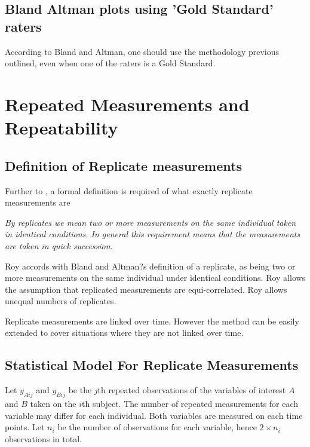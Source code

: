 \documentclass[12pt, a4paper]{report}
\theoremstyle{plain}
\theoremstyle{definition}
\theoremstyle{remark}
\begin{document}
		\newpage



	
	
	\section{Bland Altman plots using 'Gold Standard' raters}
	According to Bland and Altman, one should use the methodology
	previous outlined, even when one of the raters is a Gold Standard.
	
\chapter{Repeated Measurements and Repeatability}
	
	
	
	\section{Definition of Replicate measurements}
	Further to \citet{BA99}, a formal definition is required of what exactly replicate measurements are
	
	\emph{By replicates we mean two or more measurements on the same
		individual taken in identical conditions. In general this requirement means that the
		measurements are taken in quick succession.}
	
	Roy accords with Bland and Altman?s definition of a replicate, as being two or more measurements on the same individual under identical conditions. Roy allows the assumption that replicated measurements are equi-correlated. Roy allows unequal numbers of replicates.
	
	Replicate measurements are linked over time. However the method can be easily extended to cover situations where they are not linked over time.

	\section{Statistical Model For Replicate Measurements}
	Let $y_{Aij}$ and $y_{Bij}$ be the $j$th repeated observations of the variables of interest $A$ and $B$ taken on the $i$th subject. The number of repeated measurements for each variable may differ for each individual.
	Both variables are measured on each time points. Let $n_{i}$ be the number of observations for each variable, hence $2\times n_{i}$ observations in total.
	
\end{document}
